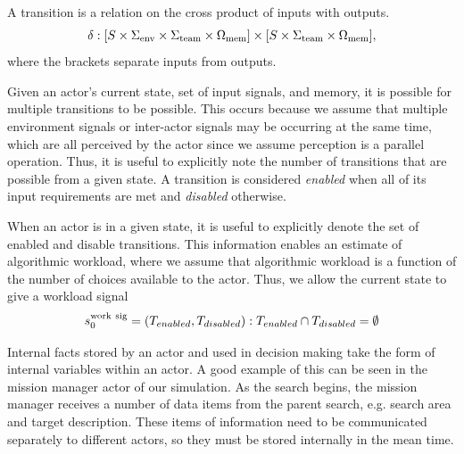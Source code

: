 A transition is a relation on the cross product of inputs with outputs.
\begin{equation}
 \delta:[S\times\Sigma_{\rm env}\times\Sigma_{\rm team}\times\Omega_{\rm mem}] \times [S\times \Sigma_{\rm team} \times \Omega_{\rm mem}], 
\end{equation} 
where the brackets separate inputs from outputs.
 
Given an actor's current state, set of input signals, and memory, it is possible for multiple transitions to be possible.  This occurs because we assume that multiple environment signals or inter-actor signals may be occurring at the same time, which are all perceived by the actor since we assume perception is a parallel operation.  Thus, it is useful to explicitly note the number of transitions that are possible from a given state.   A transition is considered {\em enabled} when all of its input
requirements are met and {\em disabled} otherwise. 

When an actor is in a given state, it is useful to explicitly denote the set of enabled and disable transitions.  This information enables an estimate of algorithmic workload, where we assume that algorithmic workload is a function of the number of choices available to the actor.  Thus, we allow the current state to give a workload signal
\begin{equation}
	s_0^{\rm work\  sig} = (T_{enabled}, T_{disabled}) : T_{enabled} \cap T_{disabled} = \emptyset
 \label{eq:state}
\end{equation}

Internal facts stored by an actor and used in decision making take the form of internal variables within an actor. A good example of this can be seen in the mission manager actor of our simulation. As the search begins, the mission manager receives a number of data items from the parent search, e.g. search area and target description. These items of information need to be communicated separately to different actors, so they must be stored internally in the mean time. 
